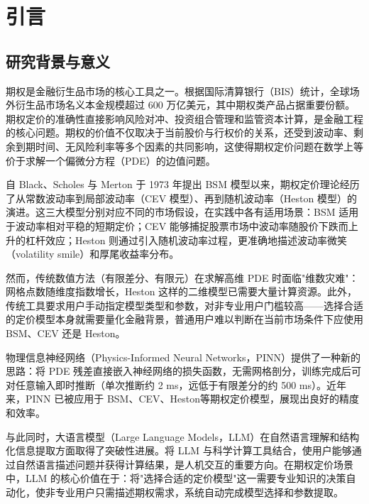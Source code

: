 \chapter{引言}\label{chap:intro}

\section{研究背景与意义}\label{sec:background}

期权是金融衍生品市场的核心工具之一。根据国际清算银行（BIS）统计，全球场外衍生品市场名义本金规模超过 600 万亿美元，其中期权类产品占据重要份额。期权定价的准确性直接影响风险对冲、投资组合管理和监管资本计算，是金融工程的核心问题。期权的价值不仅取决于当前股价与行权价的关系，还受到波动率、剩余到期时间、无风险利率等多个因素的共同影响，这使得期权定价问题在数学上等价于求解一个偏微分方程（PDE）的边值问题。

自 Black、Scholes 与 Merton 于 1973 年提出 BSM 模型\citep{black1973pricing,merton1973theory}以来，期权定价理论经历了从常数波动率到局部波动率（CEV 模型\citep{cox1976valuation}）、再到随机波动率（Heston 模型\citep{heston1993closed}）的演进。这三大模型分别对应不同的市场假设，在实践中各有适用场景：BSM 适用于波动率相对平稳的短期定价；CEV 能够捕捉股票市场中波动率随股价下跌而上升的杠杆效应；Heston 则通过引入随机波动率过程，更准确地描述波动率微笑（volatility smile）和厚尾收益率分布。

然而，传统数值方法（有限差分、有限元）在求解高维 PDE 时面临"维数灾难"：网格点数随维度指数增长，Heston 这样的二维模型已需要大量计算资源。此外，传统工具要求用户手动指定模型类型和参数，对非专业用户门槛较高——选择合适的定价模型本身就需要量化金融背景，普通用户难以判断在当前市场条件下应使用 BSM、CEV 还是 Heston。

物理信息神经网络（Physics-Informed Neural Networks，PINN）\citep{raissi2019physics}提供了一种新的思路：将 PDE 残差直接嵌入神经网络的损失函数，无需网格剖分，训练完成后可对任意输入即时推断（单次推断约 2 ms，远低于有限差分的约 500 ms）。近年来，PINN 已被应用于 BSM\citep{dhiman2023pinn}、CEV\citep{bae2024localvol}、Heston\citep{hainaut2024heston,guo2024icpinn}等期权定价模型，展现出良好的精度和效率。

与此同时，大语言模型（Large Language Models，LLM）在自然语言理解和结构化信息提取方面取得了突破性进展。将 LLM 与科学计算工具结合，使用户能够通过自然语言描述问题并获得计算结果，是人机交互的重要方向\citep{liu2025pdeagent}。在期权定价场景中，LLM 的核心价值在于：将"选择合适的定价模型"这一需要专业知识的决策自动化，使非专业用户只需描述期权需求，系统自动完成模型选择和参数提取。


